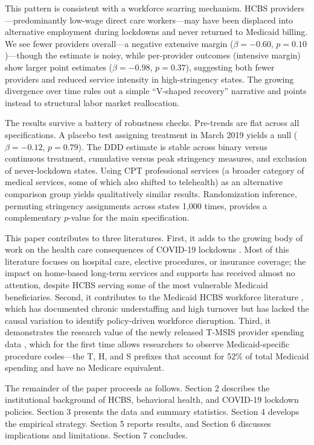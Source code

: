 \documentclass[12pt]{article}
\begin{document}
This pattern is consistent with a workforce scarring mechanism. HCBS providers---predominantly low-wage direct care workers---may have been displaced into alternative employment during lockdowns and never returned to Medicaid billing. We see fewer providers overall---a negative extensive margin ($\beta = -0.60$, $p = 0.10$)---though the estimate is noisy, while per-provider outcomes (intensive margin) show larger point estimates ($\beta = -0.98$, $p = 0.37$), suggesting both fewer providers and reduced service intensity in high-stringency states. The growing divergence over time rules out a simple ``V-shaped recovery'' narrative and points instead to structural labor market reallocation.

The results survive a battery of robustness checks. Pre-trends are flat across all specifications. A placebo test assigning treatment in March 2019 yields a null ($\beta = -0.12$, $p = 0.79$). The DDD estimate is stable across binary versus continuous treatment, cumulative versus peak stringency measures, and exclusion of never-lockdown states. Using CPT professional services (a broader category of medical services, some of which also shifted to telehealth) as an alternative comparison group yields qualitatively similar results. Randomization inference, permuting stringency assignments across states 1,000 times, provides a complementary $p$-value for the main specification.

This paper contributes to three literatures. First, it adds to the growing body of work on the health care consequences of COVID-19 lockdowns \citep{ziedan2020effects, birkmeyer2020impact, chatterji2021covid}. Most of this literature focuses on hospital care, elective procedures, or insurance coverage; the impact on home-based long-term services and supports has received almost no attention, despite HCBS serving some of the most vulnerable Medicaid beneficiaries. Second, it contributes to the Medicaid HCBS workforce literature \citep{scales2020, marquand2021, stone2017}, which has documented chronic understaffing and high turnover but has lacked the causal variation to identify policy-driven workforce disruption. Third, it demonstrates the research value of the newly released T-MSIS provider spending data \citep{hhs2026tmsis}, which for the first time allows researchers to observe Medicaid-specific procedure codes---the T, H, and S prefixes that account for 52\% of total Medicaid spending and have no Medicare equivalent.

The remainder of the paper proceeds as follows. Section 2 describes the institutional background of HCBS, behavioral health, and COVID-19 lockdown policies. Section 3 presents the data and summary statistics. Section 4 develops the empirical strategy. Section 5 reports results, and Section 6 discusses implications and limitations. Section 7 concludes.
\end{document}
